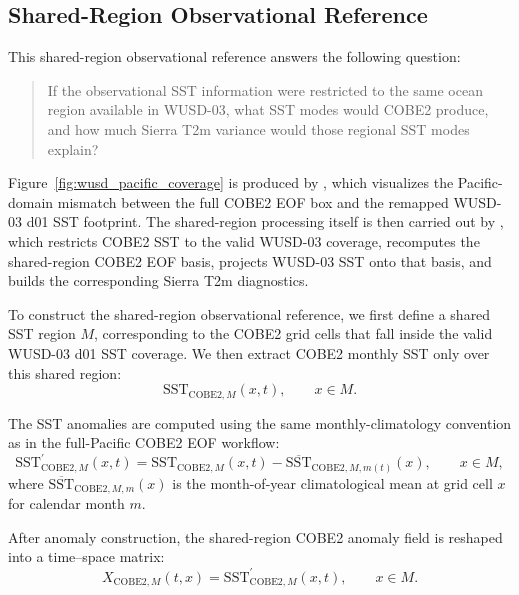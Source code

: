 \documentclass[11pt]{article}
\newcommand{\sst}{\mathrm{SST}}
\begin{document}
\subsection{Shared-Region Observational Reference}
\label{subsec:wusd_sharedregion_obs}

This shared-region observational reference answers the following question:
\begin{quote}
If the observational SST information were restricted to the same ocean region available in
WUSD-03, what SST modes would COBE2 produce, and how much Sierra T2m variance would those regional
SST modes explain?
\end{quote}

Figure~\ref{fig:wusd_pacific_coverage} is produced by
, which visualizes the
Pacific-domain mismatch between the full COBE2 EOF box and the remapped WUSD-03 d01 SST footprint.
The shared-region processing itself is then carried out by
, which restricts
COBE2 SST to the valid WUSD-03 coverage, recomputes the shared-region COBE2 EOF basis, projects
WUSD-03 SST onto that basis, and builds the corresponding Sierra T2m diagnostics.

To construct the shared-region observational reference, we first define a shared SST region $M$,
corresponding to the COBE2 grid cells that fall inside the valid WUSD-03 d01 SST coverage. We then
extract COBE2 monthly SST only over this shared region:
\begin{equation}
\sst_{\mathrm{COBE2},M}(x,t),
\qquad x \in M.
\end{equation}

The SST anomalies are computed using the same monthly-climatology convention as in the full-Pacific
COBE2 EOF workflow:
\begin{equation}
\sst_{\mathrm{COBE2},M}^{\prime}(x,t)
=
\sst_{\mathrm{COBE2},M}(x,t)
- \overline{\sst}_{\mathrm{COBE2},M,m(t)}(x),
\qquad x \in M,
\label{eq:cobe2_sharedregion_anomaly}
\end{equation}
where $\overline{\sst}_{\mathrm{COBE2},M,m}(x)$ is the month-of-year climatological mean at grid
cell $x$ for calendar month $m$.

After anomaly construction, the shared-region COBE2 anomaly field is reshaped into a time--space
matrix:
\begin{equation}
X_{\mathrm{COBE2},M}(t,x)
=
\sst_{\mathrm{COBE2},M}^{\prime}(x,t),
\qquad x \in M.
\end{equation}
\end{document}
